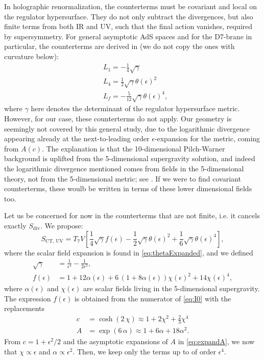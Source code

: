 In holographic renormalization, the counterterms must be covariant and local on the regulator hypersurface. They do not only subtract the divergences, but also finite terms from both IR and UV, such that the final action vanishes, required by supersymmetry. For general asymptotic AdS spaces and for the D7-brane in particular, the counterterms are derived in \cite{Karch:2005ms} (we do not copy the ones with curvature below):
\begin{align} \label{eq:Ls}
& L_{1}=-\frac{1}{4} \sqrt{\gamma} \nonumber\\
& L_{4}=\frac{1}{2} \sqrt{\gamma} \theta(\epsilon)^2 \nonumber\\
& L_{f}= -\frac{5}{12}\sqrt{\gamma} \theta(\epsilon)^4,
\end{align}
where $\gamma$ here denotes the determinant of the regulator hypersurface metric. 
However, for our case, these counterterms do not apply. Our geometry is seemingly not covered by this general study, due to the logarithmic divergence appearing already at the next-to-leading order $\epsilon$-expansion for the metric, coming from $A(c)$. The explanation is that the 10-dimensional Pilch-Warner background is uplifted from the 5-dimensional supergravity solution, and indeed the logarithmic divergence mentioned comes from fields in the 5-dimensional theory, not from the 5-dimensional metric; see \cite{Bobev:2013cja}. If we were to find covariant counterterms, these woulb be written in terms of these lower dimensional fields too.


Let us be concerned for now in the counterterms that are not finite, i.e. it cancels exactly $S_\text{div}$. We propose:
\begin{equation}\label{eq:counterterms}
 S_\text{CT, UV} =  T_7 V \left[ 
  \frac{1}{4} \sqrt{\gamma} f(\epsilon)
   -\frac{1}{2} \sqrt{\gamma} \theta (\epsilon)^2 + \frac{1}{6} \sqrt{\gamma} \theta (\epsilon)^4
   \right],
\end{equation}
where the scalar field expansion is found in \eqref{eq:thetaExpanded}, and we defined
\begin{align}
 \sqrt{\gamma} &= \frac{1}{\epsilon^4}-\frac{1}{2 \epsilon ^2},\\
 f(\epsilon) &= 1 + 12 \alpha(\epsilon) + 6 \,(1 + 8 \alpha(\epsilon )) \chi(\epsilon ) ^2+14 \chi(\epsilon )^4, \label{eq:f}
\end{align}
where $\alpha(\epsilon)$ and $\chi(\epsilon)$ are scalar fields living in the 5-dimensional supergravity. 
The expression $f(\epsilon)$ is obtained from the numerator of \eqref{eq:I0} with the replacements 
\begin{align}
c &= \cosh(2 \, \chi) \approx 1 + 2 \chi ^2 + \frac{2}{3}\chi ^4\\
A &= \exp{(6 \, \alpha)}\approx 1 + 6 \alpha + 18 \alpha ^2. 
\end{align}
From $c = 1 + \epsilon^2/2$ and the asymptotic expansions of $A$ in \eqref{eq:expandA}, we now that $\chi \propto \epsilon$ and $\alpha \propto \epsilon^2$. Then, we keep only the terms up to of order $\epsilon^4$.  

